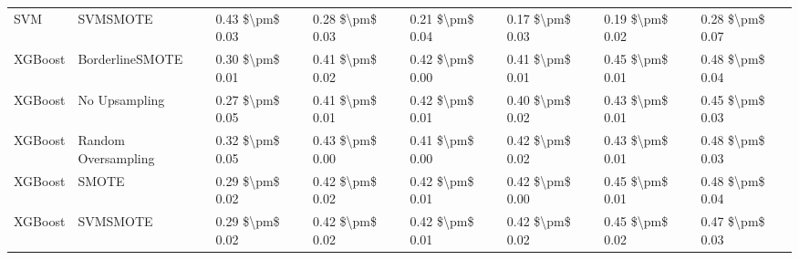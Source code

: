 \begin{tabular}{llllllll}
                            SVM &                      SVMSMOTE & 0.43 \$\textbackslash pm\$ 0.03 &           0.28 \$\textbackslash pm\$ 0.03 &       0.21 \$\textbackslash pm\$ 0.04 &        0.17 \$\textbackslash pm\$ 0.03 &                         0.19 \$\textbackslash pm\$ 0.02 &     0.28 \$\textbackslash pm\$ 0.07 \\
                        XGBoost &               BorderlineSMOTE & 0.30 \$\textbackslash pm\$ 0.01 &           0.41 \$\textbackslash pm\$ 0.02 &       0.42 \$\textbackslash pm\$ 0.00 &        0.41 \$\textbackslash pm\$ 0.01 &                         0.45 \$\textbackslash pm\$ 0.01 &     0.48 \$\textbackslash pm\$ 0.04 \\
                        XGBoost &                 No Upsampling & 0.27 \$\textbackslash pm\$ 0.05 &           0.41 \$\textbackslash pm\$ 0.01 &       0.42 \$\textbackslash pm\$ 0.01 &        0.40 \$\textbackslash pm\$ 0.02 &                         0.43 \$\textbackslash pm\$ 0.01 &     0.45 \$\textbackslash pm\$ 0.03 \\
                        XGBoost &           Random Oversampling & 0.32 \$\textbackslash pm\$ 0.05 &           0.43 \$\textbackslash pm\$ 0.00 &       0.41 \$\textbackslash pm\$ 0.00 &        0.42 \$\textbackslash pm\$ 0.02 &                         0.43 \$\textbackslash pm\$ 0.01 &     0.48 \$\textbackslash pm\$ 0.03 \\
                        XGBoost &                         SMOTE & 0.29 \$\textbackslash pm\$ 0.02 &           0.42 \$\textbackslash pm\$ 0.02 &       0.42 \$\textbackslash pm\$ 0.01 &        0.42 \$\textbackslash pm\$ 0.00 &                         0.45 \$\textbackslash pm\$ 0.01 &     0.48 \$\textbackslash pm\$ 0.04 \\
                        XGBoost &                      SVMSMOTE & 0.29 \$\textbackslash pm\$ 0.02 &           0.42 \$\textbackslash pm\$ 0.02 &       0.42 \$\textbackslash pm\$ 0.01 &        0.42 \$\textbackslash pm\$ 0.02 &                         0.45 \$\textbackslash pm\$ 0.02 &     0.47 \$\textbackslash pm\$ 0.03 \\
\bottomrule
\end{tabular}
